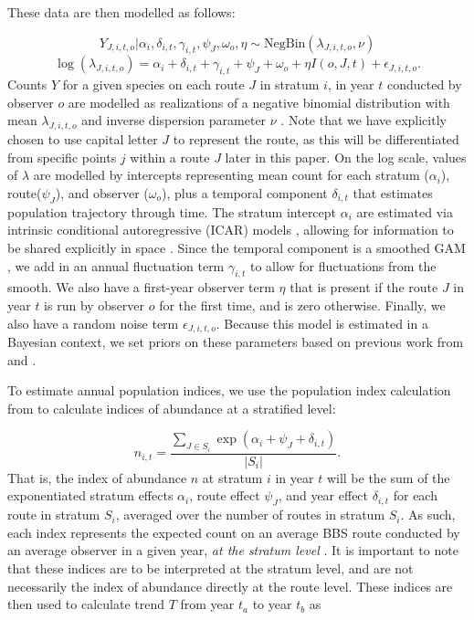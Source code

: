 \documentclass[12pt]{article}
\begin{document}
\par These data are then modelled as follows:

\begin{equation*}
	Y_{J,i,t,o} | \alpha_i, \delta_{i,t}, \gamma_{i,t}, \psi_J, \omega_o, \eta \sim \text{NegBin}(\lambda_{J,i,t,o}, \nu)
\end{equation*}
\begin{equation}\label{bbs}
\log(\lambda_{J,i,t,o}) = \alpha_i + \delta_{i,t} + \gamma_{i,t} + \psi_J + \omega_o + \eta I(o,J,t) + \epsilon_{J,i,t,o}.
\end{equation}
Counts $Y$ for a given species on each route $J$ in stratum $i$, in year $t$ conducted by observer $o$ are modelled as realizations of a negative binomial distribution with mean $\lambda_{J,i,t,o}$ and inverse dispersion parameter $\nu$ \citet{smith_spatially_2023}. 
Note that we have explicitly chosen to use capital letter $J$ to represent the route, as this will be differentiated from specific points $j$ within a route $J$ later in this paper.
On the log scale, values of $\lambda$ are modelled by intercepts representing mean count for each stratum ($\alpha_i$), route($\psi_J$), and observer ($\omega_o$), plus a temporal component $\delta_{i,t}$ that estimates population trajectory through time. 
The stratum intercept $\alpha_i$ are estimated via intrinsic conditional autoregressive (ICAR) models \citep{besag_bayesian_1991}, allowing for information to be shared explicitly in space \citep{smith_spatially_2023}.
Since the temporal component is a smoothed GAM \citep{smith_north_2021}, we add in an annual fluctuation term $\gamma_{i,t}$ to allow for fluctuations from the smooth. 
We also have a first-year observer term $\eta$ that is present if the route $J$ in year $t$ is run by observer $o$ for the first time, and is zero otherwise. 
Finally, we also have a random noise term $\epsilon_{J,i,t,o}$.
Because this model is estimated in a Bayesian context, we set priors on these parameters based on previous work from \citet{smith_north_2021} and \citet{smith_spatially_2023}.

\par To estimate annual population indices, we use the population index calculation from \citet{smith_north_2021} to calculate indices of abundance at a stratified level:

\begin{equation}\label{index}
	n_{i,t} = \dfrac{\sum_{J\in S_i}\exp(\alpha_i + \psi_J + \delta_{i,t})}{|S_i|}.
\end{equation}
That is, the index of abundance $n$ at stratum $i$ in year $t$ will be the sum of the exponentiated stratum effects $\alpha_i$, route effect $\psi_J$, and year effect $\delta_{i,t}$ for each route in stratum $S_i$, averaged over the number of routes in stratum $S_i$.
As such, each index represents the expected count on an average BBS route conducted by an average observer in a given year, \textit{at the stratum level} \citep{smith_north_2021}.
It is important to note that these indices are to be interpreted at the stratum level, and are not necessarily the index of abundance directly at the route level.
These indices are then used to calculate trend $T$ from year $t_a$ to year $t_b$ as
\end{document}
